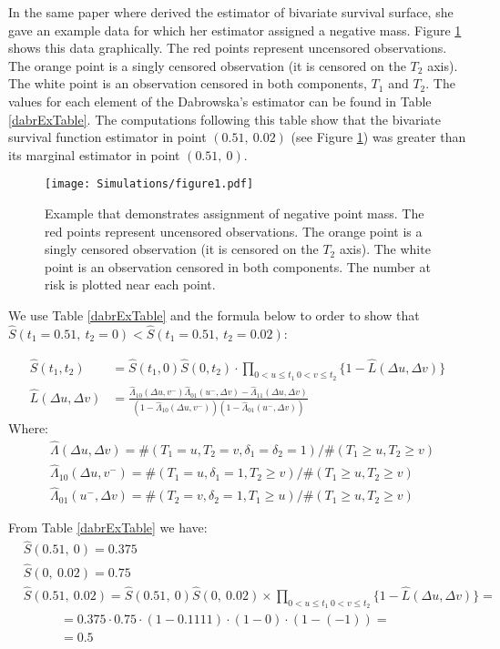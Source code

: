 \documentclass[]{article}
\begin{document}
In the same paper where \cite{dabrowska1988kaplan} derived the estimator of bivariate survival surface, she gave an example data for which her estimator assigned a negative mass. Figure \ref{fig:bubbles} shows this data graphically. The red points represent uncensored observations. The orange point is a singly censored observation (it is censored on the $T_2$ axis). The white point is an observation censored in both components, $T_1$ and $T_2$. The values for each element of the Dabrowska's estimator can be found in Table \ref{dabrExTable}. The computations following this table show that the bivariate survival function estimator in point $(0.51,~0.02)$ (see Figure \ref{fig:bubbles}) was greater than its marginal estimator in point $(0.51,~0)$.
\begin{figure}[!h]
\caption[Example that demonstrates assignment of negative point mass.]{Example that demonstrates assignment of negative point mass. The red points represent uncensored observations. The orange point is a singly censored observation (it is censored on the $T_2$ axis). The white point is an observation censored in both components. The number at risk is plotted near each point.}
\texttt{[image: Simulations/figure1.pdf]}
\label{fig:bubbles}
\end{figure}

We use Table \ref{dabrExTable} and the formula below to order to show that $\hat{S}(t_1=0.51,~t_2=0) < \hat{S}(t_1=0.51,~t_2=0.02)$:

	$$
	\begin{aligned}
		\hat{S}(t_1,t_2) &= \hat{S}(t_1,0)\hat{S}(0,t_2)\cdot \prod_{{0<u\leq t_1~0<v\leq t_2}}\{1 - \hat{L}(\Delta u, \Delta v)\}\\
		\hat{L}(\Delta u, \Delta v) &= \frac{\hat{\Lambda}_{10}(\Delta u,v^-)\hat{\Lambda}_{01}(u^-,\Delta v) - \hat{\Lambda}_{11}(\Delta u, \Delta v)}{\left(1-\hat{\Lambda}_{10}(\Delta u,v^-)\right)\left(1-\hat{\Lambda}_{01}(u^-,\Delta v)\right)}
	\end{aligned}
	$$
Where:
	$$
	\begin{aligned}
	&\hat{\Lambda}(\Delta u, \Delta v) = \#(T_1=u, T_2=v, \delta_1=\delta_2=1)/\#(T_1\geq u, T_2\geq v)\\
	&\hat{\Lambda}_{10}(\Delta u, v^-) = \#(T_1=u, \delta_1=1, T_2\geq v)/\#(T_1\geq u, T_2\geq v)\\
	&\hat{\Lambda}_{01}(u^-,\Delta  v) = \#(T_2=v, \delta_2=1, T_1\geq u)/\#(T_1\geq u, T_2\geq v)
	\end{aligned}
	$$



From Table \ref{dabrExTable} we have:
	$$
	\begin{aligned}
		&\hat{S}(0.51,~0)  = 0.375\\
		&\hat{S}(0,~0.02)  = 0.75\\
		&\hat{S}(0.51,~0.02) = \hat{S}(0.51,~0)\hat{S}(0,~0.02) \times 
		\prod_{{0<u\leq t_1~0<v\leq t_2}}\{1 - \hat{L}(\Delta u, \Delta v)\}=\\
		&~~~~~~~~~~~~~= 0.375 \cdot 0.75 \cdot (1-0.1111)\cdot (1-0)\cdot (1-(-1)) = \\
		&~~~~~~~~~~~~~= 0.5
	\end{aligned}
	$$
\end{document}

